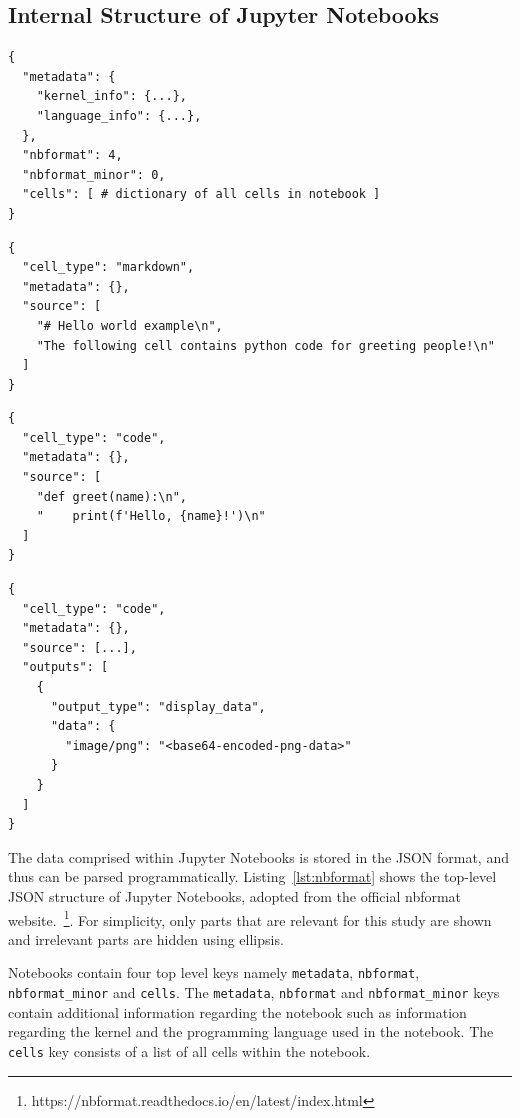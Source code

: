 \documentclass[conference]{IEEEtran}
\begin{document}
\subsection{Internal Structure of Jupyter Notebooks}\label{sec:nbformat}

\begin{lstlisting}[caption={Top-level JSON format of Jupyter notebooks. See Listing~\ref{lst:cell-md},~\ref{lst:cell-code} and~\ref{lst:cell-output} for internal structure of various cells.}, label={lst:nbformat}]
{
  "metadata": {
    "kernel_info": {...},
    "language_info": {...},
  },
  "nbformat": 4,
  "nbformat_minor": 0,
  "cells": [ # dictionary of all cells in notebook ]
}
\end{lstlisting}
\begin{lstlisting}[caption={JSON structure of markdown cells.}, label={lst:cell-md}]
{
  "cell_type": "markdown",
  "metadata": {},
  "source": [
    "# Hello world example\n",
    "The following cell contains python code for greeting people!\n"
  ]
}
\end{lstlisting}

\begin{lstlisting}[caption={JSON structure of code cells.}, label={lst:cell-code}]
{
  "cell_type": "code",
  "metadata": {},
  "source": [
    "def greet(name):\n",
    "    print(f'Hello, {name}!')\n"
  ]
}
\end{lstlisting}

\begin{lstlisting}[caption={JSON structure of code cells with an image output.}, label={lst:cell-output}]
{
  "cell_type": "code",
  "metadata": {},
  "source": [...],
  "outputs": [
    {
      "output_type": "display_data",
      "data": {
        "image/png": "<base64-encoded-png-data>"
      }
    }
  ]
}
\end{lstlisting}

The data comprised within Jupyter Notebooks is stored in the JSON format, and thus can be parsed programmatically. Listing~\ref{lst:nbformat} shows the top-level JSON structure of Jupyter Notebooks, adopted from the official nbformat website.~\footnote{https://nbformat.readthedocs.io/en/latest/index.html}. For simplicity, only parts that are relevant for this study are shown and irrelevant parts are hidden using ellipsis.

Notebooks contain four top level keys namely \texttt{metadata}, \texttt{nbformat}, \texttt{nbformat\_minor} and \texttt{cells}. The \texttt{metadata}, \texttt{nbformat} and \texttt{nbformat\_minor} keys contain additional information regarding the notebook such as information regarding the kernel and the programming language used in the notebook. The \texttt{cells} key consists of a list of all cells within the notebook.
\end{document}
